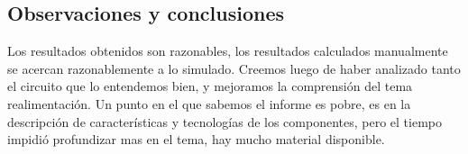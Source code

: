 
\subsection{Observaciones y conclusiones}

Los resultados obtenidos son razonables, los resultados calculados manualmente se acercan razonablemente a lo simulado. Creemos luego de haber analizado tanto el circuito que lo entendemos bien, y mejoramos la comprensión del tema realimentación. Un punto en el que sabemos el informe es pobre, es en la descripción de características y tecnologías de los componentes, pero el tiempo impidió profundizar mas en el tema, hay mucho material disponible.
